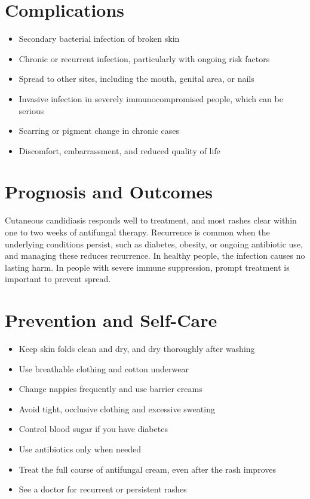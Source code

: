 \section*{Complications}
\begin{itemize}
    \item Secondary bacterial infection of broken skin
    \item Chronic or recurrent infection, particularly with ongoing risk factors
    \item Spread to other sites, including the mouth, genital area, or nails
    \item Invasive infection in severely immunocompromised people, which can be serious
    \item Scarring or pigment change in chronic cases
    \item Discomfort, embarrassment, and reduced quality of life
\end{itemize}

\section*{Prognosis and Outcomes}
Cutaneous candidiasis responds well to treatment, and most rashes clear within one to two weeks of antifungal therapy. Recurrence is common when the underlying conditions persist, such as diabetes, obesity, or ongoing antibiotic use, and managing these reduces recurrence. In healthy people, the infection causes no lasting harm. In people with severe immune suppression, prompt treatment is important to prevent spread.

\section*{Prevention and Self-Care}
\begin{itemize}
    \item Keep skin folds clean and dry, and dry thoroughly after washing
    \item Use breathable clothing and cotton underwear
    \item Change nappies frequently and use barrier creams
    \item Avoid tight, occlusive clothing and excessive sweating
    \item Control blood sugar if you have diabetes
    \item Use antibiotics only when needed
    \item Treat the full course of antifungal cream, even after the rash improves
    \item See a doctor for recurrent or persistent rashes
\end{itemize}

